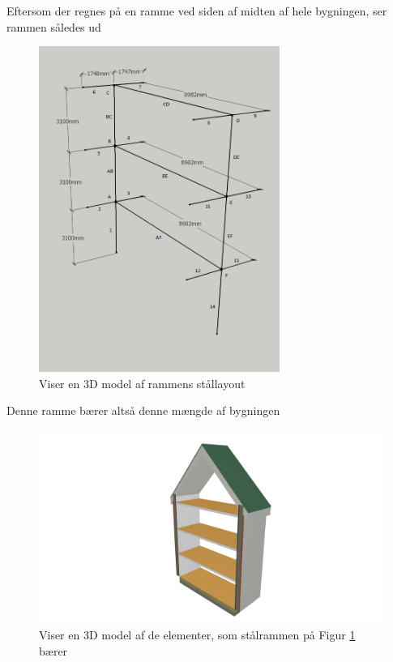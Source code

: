 	Eftersom der regnes på en ramme ved siden af midten af hele bygningen, ser rammen således ud
\begin{figure}[H] 
	\centering
	\includegraphics[width=0.7\textwidth]{billeder/Staaldimensioner_5}
	\caption{Viser en 3D model af rammens stållayout }
	\label{fig:EL1}
\end{figure}	
	\newpage
	Denne ramme bærer altså denne mængde af bygningen
\begin{figure}[H] 
	\centering
	\includegraphics[width=1\textwidth]{billeder/Tvaersnit1}
	\caption{Viser en 3D model af de elementer, som stålrammen på Figur \ref{fig:EL1} bærer}
	\label{fig:EL2}
\end{figure}

